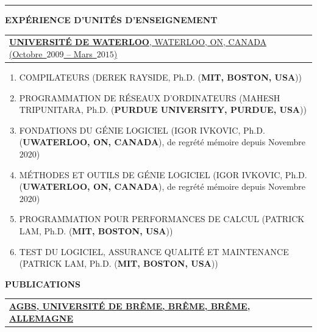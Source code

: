 \documentclass[9pt,a4paper]{article} %
\makeatletter
\newcommand{\headerrow}[2]
{\begin{tabular*}{\linewidth}{l@{\extracolsep{\fill}}r}
	#1 &
	#2 \\
\end{tabular*}}
\newcommand{\headerrowONE}[1]{\headerrow{#1}{}}
\makeatother
\begin{document}
\vspace{1em}

\hrule
\begin{center}
{\large \textbf{EXPÉRIENCE D'UNITÉS D'ENSEIGNEMENT}}
\end{center}

\vspace{0.5em}

\headerrowONE{\href{http://ece.uwaterloo.ca}{\textbf{UNIVERSITÉ DE WATERLOO}, WATERLOO, ON, CANADA (Octobre~$2009$ -- Mars~$2015$)}}

\begin{enumerate}
	\itemsep -0.3em
	\item COMPILATEURS (DEREK RAYSIDE, Ph.D. (\textbf{MIT, BOSTON, USA}))
	\item PROGRAMMATION DE RÉSEAUX D'ORDINATEURS (MAHESH TRIPUNITARA, Ph.D. (\textbf{PURDUE UNIVERSITY, PURDUE, USA}))
	\item FONDATIONS DU GÉNIE LOGICIEL (IGOR IVKOVIC, Ph.D. (\textbf{UWATERLOO, ON, CANADA}), 
		de regrété mémoire depuis Novembre~$2020$)
	\item MÉTHODES ET OUTILS DE GÉNIE LOGICIEL (IGOR IVKOVIC, Ph.D. (\textbf{UWATERLOO, ON, CANADA}), 
		de regrété mémoire depuis Novembre~$2020$)
	\item PROGRAMMATION POUR PERFORMANCES DE CALCUL (PATRICK LAM, Ph.D. (\textbf{MIT, BOSTON, USA}))
	\item TEST DU LOGICIEL, ASSURANCE QUALITÉ ET MAINTENANCE (PATRICK LAM, Ph.D. (\textbf{MIT, BOSTON, USA}))
\end{enumerate}


\vspace{1em}

\newpage

\begin{center}
{\large \textbf{PUBLICATIONS}}
\end{center}

\vspace{0.5em}


\headerrowONE{\href{http://www.informatik.uni-bremen.de/agbs}{
	\textbf{AGBS, UNIVERSITÉ DE BRÊME, BRÊME, BRÊME, ALLEMAGNE}}}

\vspace{0.3em}
\end{document}
